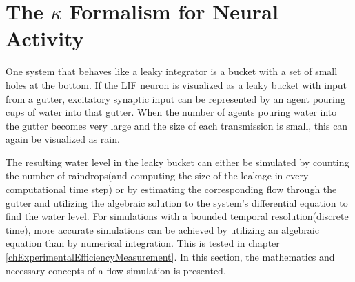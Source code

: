 


\section{The $\kappa$ Formalism for Neural Activity}
	\label{secDevelopmentOfTheNovelANNmodel}
	One system that behaves like a leaky integrator is a bucket with a set of small holes at the bottom.
	If the LIF neuron is visualized as a leaky bucket with input from a gutter, excitatory synaptic input can be represented by an agent pouring cups of water into that gutter.
	When the number of agents pouring water into the gutter becomes very large and the size of each transmission is small, this can again be visualized as rain.

	The resulting water level in the leaky bucket can either be simulated by counting the number of raindrops(and computing the size of the leakage in every computational time step)
		or by estimating the corresponding flow through the gutter and utilizing the algebraic solution to the system's differential equation to find the water level.
	For simulations with a bounded temporal resolution(discrete time), more accurate simulations can be achieved by utilizing an algebraic equation than by numerical integration.
	This is tested in chapter \ref{chExperimentalEfficiencyMeasurement}.
	In this section, the mathematics and necessary concepts of a flow simulation is presented.






